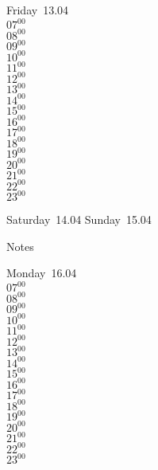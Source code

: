 \documentclass[11pt, a4paper]{book}\usepackage[]{graphicx}\usepackage[]{color}
\begin{document}
\begin{weekdaybox}
  Friday~13.04\\
  { 
  \vfill
  $07^{00}$\\
$08^{00}$\\
$09^{00}$\\
$10^{00}$\\
$11^{00}$\\
$12^{00}$\\
$13^{00}$\\
$14^{00}$\\
$15^{00}$\\
$16^{00}$\\
$17^{00}$\\
$18^{00}$\\
$19^{00}$\\
$20^{00}$\\
$21^{00}$\\
$22^{00}$\\
$23^{00}$\\
  }
\end{weekdaybox}
\begin{weekendbox}
  Saturday~14.04
  \tcblower
  Sunday~15.04
\end{weekendbox} %
\begin{notebox}
  Notes
\end{notebox}
\clearpage
\begin{headerbox}
\end{headerbox}
\begin{weekdaybox}
  Monday~16.04\\
  { 
  \vfill
  $07^{00}$\\
$08^{00}$\\
$09^{00}$\\
$10^{00}$\\
$11^{00}$\\
$12^{00}$\\
$13^{00}$\\
$14^{00}$\\
$15^{00}$\\
$16^{00}$\\
$17^{00}$\\
$18^{00}$\\
$19^{00}$\\
$20^{00}$\\
$21^{00}$\\
$22^{00}$\\
$23^{00}$\\
  }
\end{weekdaybox}
\end{document}
